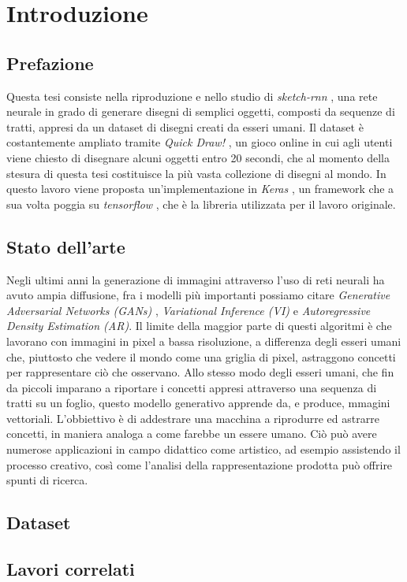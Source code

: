 \chapter{Introduzione}
\section{Prefazione}
Questa tesi consiste nella riproduzione e nello studio di \textit{sketch-rnn} \cite{sketchrnn}, una rete neurale in grado di generare disegni di semplici oggetti, composti da sequenze di tratti, appresi da un dataset di disegni creati da esseri umani. Il dataset è costantemente ampliato tramite \textit{Quick Draw!} \cite{quickdraw}, un gioco online in cui agli utenti viene chiesto di disegnare alcuni oggetti entro 20 secondi, che al momento della stesura di questa tesi costituisce la più vasta collezione di disegni al mondo. In questo lavoro viene proposta un'implementazione in \textit{Keras} \cite{keras}, un framework che a sua volta poggia su \textit{tensorflow} \cite{tensorflow}, che è la libreria utilizzata per il lavoro originale.
\section{Stato dell'arte}
Negli ultimi anni la generazione di immagini attraverso l'uso di reti neurali ha avuto ampia diffusione, fra i modelli più importanti possiamo citare \textit{Generative Adversarial Networks (GANs)} \cite{GAN}, \textit{Variational Inference (VI)} \cite{VI} e \textit{Autoregressive Density Estimation (AR)}. \cite{AR} Il limite della maggior parte di questi algoritmi è che lavorano con immagini in pixel a bassa risoluzione, a differenza degli esseri umani che, piuttosto che vedere il mondo come una griglia di pixel, astraggono concetti per rappresentare ciò che osservano. Allo stesso modo degli esseri umani, che fin da piccoli imparano a riportare i concetti appresi attraverso una sequenza di tratti su un foglio, questo modello generativo apprende da, e produce, mmagini vettoriali.
L'obbiettivo è di addestrare una macchina a riprodurre ed astrarre concetti, in maniera analoga a come farebbe un essere umano. Ciò può avere numerose applicazioni in campo didattico come artistico, ad esempio assistendo il processo creativo, così come l'analisi della rappresentazione prodotta può offrire spunti di ricerca.
\section{Dataset}

\section{Lavori correlati}